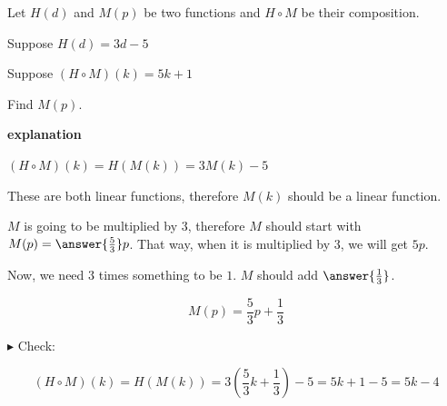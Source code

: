 \documentclass{ximera}
\begin{document}
\begin{example}


Let $H(d)$ and $M(p)$ be two functions and $H \circ M$ be their composition.


Suppose $H(d) = 3 d - 5$ 

Suppose $(H \circ M)(k) = 5 k + 1$


Find $M(p)$.



\textbf{\textcolor{red!75!green}{explanation}} 




$(H \circ M)(k) = H(M(k)) = 3 M(k) - 5 $  




These are both linear functions, therefore $M(k)$ should be a linear function.


$M$ is going to be multiplied by $3$, therefore $M$ should start with $M(p) = \answer{\frac{5}{3}}p$. That way, when it is multiplied by $3$, we will get $5p$.




Now, we need $3$ times something to be $1$.  $M$ should add $\answer{\frac{1}{3}}$.

\[  M(p) =    \frac{5}{3} p +     \frac{1}{3} \]



$\blacktriangleright$ Check: 


\[    (H \circ M)(k) = H(M(k)) = 3 \left( \frac{5}{3} k + \frac{1}{3} \right) - 5 =    5 k + 1 -5 = 5 k -4    \]






\end{example}
\end{document}
